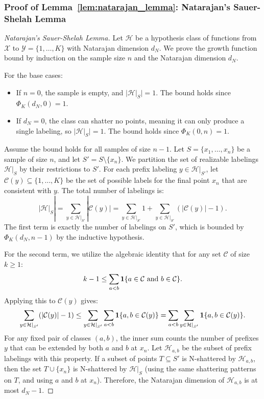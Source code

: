 \subsubsection*{Proof of Lemma~\ref{lem:natarajan_lemma}: Natarajan's Sauer-Shelah Lemma}
\label{app:proof_natarajan_lemma}
\begin{proof}[Natarajan's Sauer-Shelah Lemma]
Let $\mathcal{H}$ be a hypothesis class of functions from $\mathcal{X}$ to $\mathcal{Y} = \{1, \dots, K\}$ with Natarajan dimension $d_N$. We prove the growth function bound by induction on the sample size $n$ and the Natarajan dimension $d_N$.

For the base cases:
\begin{itemize}
    \item If $n = 0$, the sample is empty, and $|\mathcal{H}|_S| = 1$. The bound holds since $\Phi_K(d_N, 0) = 1$.
    \item If $d_N = 0$, the class can shatter no points, meaning it can only produce a single labeling, so $|\mathcal{H}|_S| = 1$. The bound holds since $\Phi_K(0, n) = 1$.
\end{itemize}

Assume the bound holds for all samples of size $n - 1$. Let $S = \{x_1, \dots, x_n\}$ be a sample of size $n$, and let $S' = S \setminus \{x_n\}$. We partition the set of realizable labelings $\mathcal{H}|_S$ by their restrictions to $S'$. For each prefix labeling $y \in \mathcal{H}|_{S'}$, let $\mathcal{C}(y) \subseteq \{1, \dots, K\}$ be the set of possible labels for the final point $x_n$ that are consistent with $y$. The total number of labelings is:
\begin{equation}
    |\mathcal{H}|_S| = \sum_{y \in \mathcal{H}|_{S'}} |\mathcal{C}(y)| = \sum_{y \in \mathcal{H}|_{S'}} 1 + \sum_{y \in \mathcal{H}|_{S'}} (|\mathcal{C}(y)| - 1).
\end{equation}
The first term is exactly the number of labelings on $S'$, which is bounded by $\Phi_K(d_N, n - 1)$ by the inductive hypothesis.

For the second term, we utilize the algebraic identity that for any set $\mathcal{C}$ of size $k \ge 1$:
\begin{equation}
    k - 1 \le \sum_{a < b} \mathbf{1}\{a \in \mathcal{C} \text{ and } b \in \mathcal{C}\}.
\end{equation}
Applying this to $\mathcal{C}(y)$ gives:
\begin{equation}
    \sum_{y \in \mathcal{H}|_{S'}} (|\mathcal{C}(y)| - 1) \le \sum_{y \in \mathcal{H}|_{S'}} \sum_{a < b} \mathbf{1}\{a, b \in \mathcal{C}(y)\} = \sum_{a < b} \sum_{y \in \mathcal{H}|_{S'}} \mathbf{1}\{a, b \in \mathcal{C}(y)\}.
\end{equation}
For any fixed pair of classes $(a, b)$, the inner sum counts the number of prefixes $y$ that can be extended by both $a$ and $b$ at $x_n$. Let $\mathcal{H}_{a,b}$ be the subset of prefix labelings with this property. If a subset of points $T \subseteq S'$ is N-shattered by $\mathcal{H}_{a,b}$, then the set $T \cup \{x_n\}$ is N-shattered by $\mathcal{H}|_S$ (using the same shattering patterns on $T$, and using $a$ and $b$ at $x_n$). Therefore, the Natarajan dimension of $\mathcal{H}_{a,b}$ is at most $d_N - 1$.


\end{proof}
